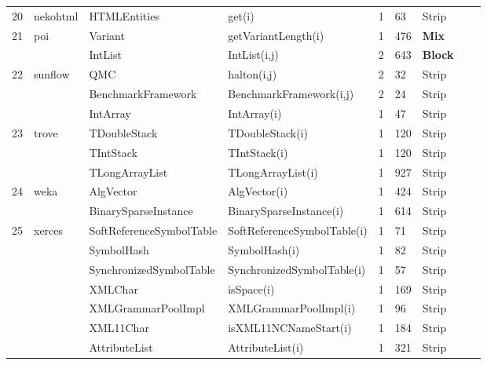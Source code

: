 \begin{table}[H]
{{\begin{tabular}{|l|l|l|l|l|l|l|l|l|}
20	&	nekohtml	& HTMLEntities			& get(i)					& 1			& 63	& Strip  										\\ 
21	&	poi			& Variant				& getVariantLength(i)		& 1			& 476	& {\bf Mix}  										\\ 
	&				& IntList					& IntList(i,j)				& 2			& 643	& {\bf Block} 										\\ 	
22	&	sunflow		& QMC					& halton(i,j)				& 2			& 32	& Strip  										\\ 
	&				& BenchmarkFramework	& BenchmarkFramework(i,j) & 2		& 24	& Strip   										\\ 
	&				& IntArray				& IntArray(i)				& 1			& 47	& Strip 										\\ 	
23	&	trove		& TDoubleStack			& TDoubleStack(i)		& 1			& 120	& Strip  										\\ 
	&				& TIntStack				& TIntStack(i)			& 1			& 120	& Strip  										\\ 
	&				& TLongArrayList			& TLongArrayList(i)		& 1			& 927	& Strip  										\\ 
24	&	weka		& AlgVector				& AlgVector(i)			& 1			& 424	& Strip  										\\ 
	&				& BinarySparseInstance	& BinarySparseInstance(i)  & 1			& 614	& Strip 										\\ 
25	&	xerces		& SoftReferenceSymbolTable& SoftReferenceSymbolTable(i) & 1	& 71	& Strip  										\\ 
	&				& SymbolHash			& SymbolHash(i)			& 1			& 82	& Strip 										\\ 
	&				& SynchronizedSymbolTable& SynchronizedSymbolTable(i) & 1	& 57	& Strip  										\\ 
	&				& XMLChar				& isSpace(i)				& 1			& 169	& Strip 										\\ 
	&				& XMLGrammarPoolImpl	& XMLGrammarPoolImpl(i)	& 1			& 96	& Strip   										\\ 
	&				& XML11Char			& isXML11NCNameStart(i)	& 1			& 184	& Strip  										\\ 
	&				& AttributeList			& AttributeList(i)			& 1			& 321	& Strip  										\\ 
\hline

\end{tabular}
}
}
\bigskip
\label{table:packages}
\end{table}























